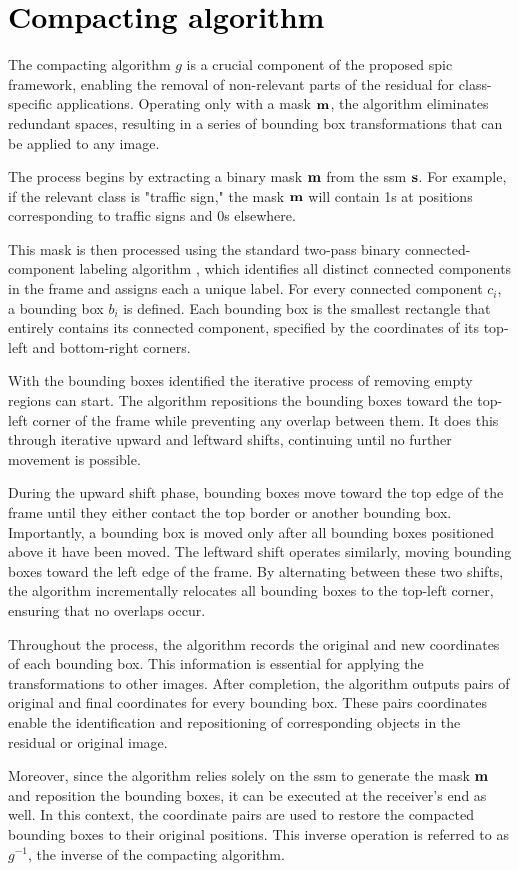 \chapter{\textcolor{black}{Compacting algorithm}}\label{app: SPIC compacting}

The compacting algorithm $g$ is a crucial component of the proposed \gls{spic} framework, enabling the removal of non-relevant parts of the residual for class-specific applications. Operating only with a mask $\mathbf{m}$, the algorithm eliminates redundant spaces, resulting in a series of bounding box transformations that can be applied to any image.

The process begins by extracting a binary mask $\mathbf{m}$ from the \gls{ssm} $\mathbf{s}$. For example, if the relevant class is "traffic sign," the mask $\mathbf{m}$ will contain 1s at positions corresponding to traffic signs and 0s elsewhere.

This mask is then processed using the standard two-pass binary connected-component labeling algorithm \cite{Shapiro2001connectedCOmp}, which identifies all distinct connected components in the frame and assigns each a unique label. For every connected component $c_i$, a bounding box $b_i$ is defined. Each bounding box is the smallest rectangle that entirely contains its connected component, specified by the coordinates of its top-left and bottom-right corners.

With the bounding boxes identified the iterative process of removing empty regions can start. The algorithm repositions the bounding boxes toward the top-left corner of the frame while preventing any overlap between them. It does this through iterative upward and leftward shifts, continuing until no further movement is possible.

During the upward shift phase, bounding boxes move toward the top edge of the frame until they either contact the top border or another bounding box. Importantly, a bounding box is moved only after all bounding boxes positioned above it have been moved. The leftward shift operates similarly, moving bounding boxes toward the left edge of the frame. By alternating between these two shifts, the algorithm incrementally relocates all bounding boxes to the top-left corner, ensuring that no overlaps occur.

Throughout the process, the algorithm records the original and new coordinates of each bounding box. This information is essential for applying the transformations to other images. After completion, the algorithm outputs pairs of original and final coordinates for every bounding box. These pairs coordinates enable the identification and repositioning of corresponding objects in the residual or original image.

Moreover, since the algorithm relies solely on the \gls{ssm} to generate the mask $\mathbf{m}$ and reposition the bounding boxes, it can be executed at the receiver's end as well. In this context, the coordinate pairs are used to restore the compacted bounding boxes to their original positions. This inverse operation is referred to as $g^{-1}$, the inverse of the compacting algorithm.